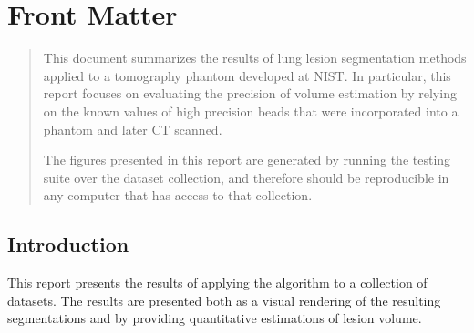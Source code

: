\documentclass{InsightArticle}
\begin{document}
\newcommand{\insertResultsForDataset}[2]{
\subsection{Dataset #1 #2}
\composeFigureFromDatasetFeatures{#1}{#2}
\composeFigureFromDatasetSegmentations{#1}{#2}
}

\newcommand{\insertResultsForStack}[1]{
\insertResultsForDataset{#1}{001}
\insertResultsForDataset{#1}{002}
\insertResultsForDataset{#1}{003}
\insertResultsForDataset{#1}{004}
\insertResultsForDataset{#1}{005}
\insertResultsForDataset{#1}{006}
\insertResultsForDataset{#1}{007}
\insertResultsForDataset{#1}{008}
\insertResultsForDataset{#1}{009}
\insertResultsForDataset{#1}{010}
\insertResultsForDataset{#1}{011}
\insertResultsForDataset{#1}{012}
\insertResultsForDataset{#1}{013}
\insertResultsForDataset{#1}{014}
\insertResultsForDataset{#1}{015}
\insertResultsForDataset{#1}{016}
\insertResultsForDataset{#1}{017}
\insertResultsForDataset{#1}{018}
}

\maketitle

\ifhtml
\chapter*{Front Matter\label{front}}
\fi


\begin{abstract}
\noindent
This document summarizes the results of lung lesion segmentation methods
applied to a tomography phantom developed at NIST. In particular, this report
focuses on evaluating the precision of volume estimation by relying on the
known values of high precision beads that were incorporated into a phantom and
later CT scanned.

The figures presented in this report are generated by running the testing suite
over the dataset collection, and therefore should be reproducible in any
computer that has access to that collection.
\end{abstract}

\tableofcontents

\section{Introduction}

This report presents the results of applying the algorithm to a collection of
datasets. The results are presented both as a visual rendering of the resulting
segmentations and by providing quantitative estimations of lesion volume.
\end{document}
